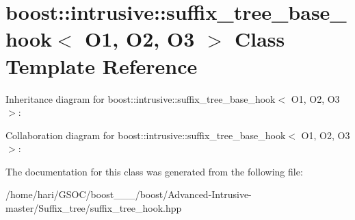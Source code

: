\hypertarget{classboost_1_1intrusive_1_1suffix__tree__base__hook}{}\section{boost\+:\+:intrusive\+:\+:suffix\+\_\+tree\+\_\+base\+\_\+hook$<$ O1, O2, O3 $>$ Class Template Reference}
\label{classboost_1_1intrusive_1_1suffix__tree__base__hook}


Inheritance diagram for boost\+:\+:intrusive\+:\+:suffix\+\_\+tree\+\_\+base\+\_\+hook$<$ O1, O2, O3 $>$\+:


Collaboration diagram for boost\+:\+:intrusive\+:\+:suffix\+\_\+tree\+\_\+base\+\_\+hook$<$ O1, O2, O3 $>$\+:


The documentation for this class was generated from the following file\+:\begin{DoxyCompactItemize}
\item 
/home/hari/\+G\+S\+O\+C/boost\+\_\+\_\+\_/boost/\+Advanced-\/\+Intrusive-\/master/\+Suffix\+\_\+tree/suffix\+\_\+tree\+\_\+hook.\+hpp\end{DoxyCompactItemize}
